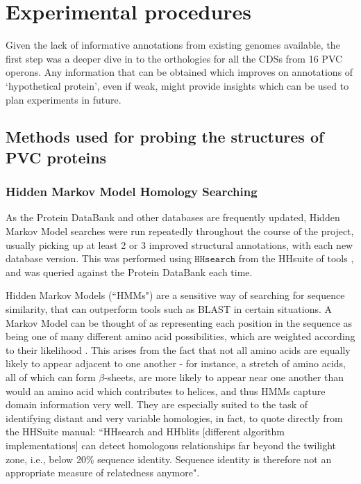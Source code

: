 \clearpage

\section{Experimental procedures}
Given the lack of informative annotations from existing genomes available, the first step was a deeper dive in to the orthologies for all the CDSs from 16 PVC operons. Any information that can be obtained which improves on annotations of `hypothetical protein', even if weak, might provide insights which can be used to plan experiments in future.
	 

\subsection{Methods used for probing the structures of PVC proteins}
\subsubsection{Hidden Markov Model Homology Searching}\label{hhresults}
As the Protein DataBank and other databases are frequently updated, Hidden Markov Model searches were run repeatedly throughout the course of the project, usually picking up at least 2 or 3 improved structural annotations, with each new database version. This was performed using $\mathtt{HHsearch}$ from the HHsuite of tools \citep{Remmert2012}, and was queried against the Protein DataBank each time.
	
Hidden Markov Models (``HMMs") are a sensitive way of searching for sequence similarity, that can outperform tools such as BLAST in certain situations. A Markov Model can be thought of as representing each position in the sequence as being one of many different amino acid possibilities, which are weighted according to their likelihood \citep{Eddy2004}. This arises from the fact that not all amino acids are equally likely to appear adjacent to one another - for instance, a stretch of amino acids, all of which can form $\beta$-sheets, are more likely to appear near one another than would an amino acid which contributes to helices, and thus HMMs capture domain information very well. They are especially suited to the task of identifying distant and very variable homologies, in fact, to quote directly from the HHSuite manual: ``HHsearch and HHblits [different algorithm implementations] can detect homologous relationships far beyond the twilight zone, i.e., below 20\% sequence identity. Sequence identity is therefore not an appropriate measure of relatedness anymore".

